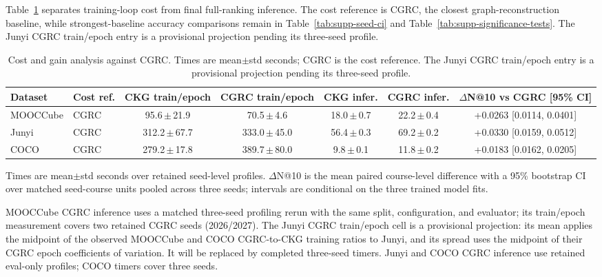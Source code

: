 Table~\ref{tab:supp-cost-tradeoff} separates training-loop cost from final full-ranking inference. The cost reference is CGRC, the closest graph-reconstruction baseline, while strongest-baseline accuracy comparisons remain in Table~\ref{tab:supp-seed-ci} and Table~\ref{tab:supp-significance-tests}. The Junyi CGRC train/epoch entry is a provisional projection pending its three-seed profile.

\begin{table}[t]
\centering
\caption{Cost and gain analysis against CGRC. Times are mean\(\pm\)std seconds; CGRC is the cost reference. The Junyi CGRC train/epoch entry is a provisional projection pending its three-seed profile.}
\label{tab:supp-cost-tradeoff}
\tablecaptiongap
\small
\setlength{\tabcolsep}{2.4pt}
\begin{tabular*}{\textwidth}{@{\extracolsep{\fill}}llccccc}
\toprule
Dataset & Cost ref. & CKG train/epoch & CGRC train/epoch & CKG infer. & CGRC infer. & \(\Delta\)N@10 vs CGRC [95\% CI] \\
\midrule
MOOCCube & CGRC & 95.6\,$\pm$\,21.9 & 70.5\,$\pm$\,4.6 & 18.0\,$\pm$\,0.7 & 22.2\,$\pm$\,0.4 & +0.0263 [0.0114, 0.0401] \\
Junyi & CGRC & 312.2\,$\pm$\,67.7 & 333.0\,$\pm$\,45.0 & 56.4\,$\pm$\,0.3 & 69.2\,$\pm$\,0.2 & +0.0330 [0.0159, 0.0512] \\
COCO & CGRC & 279.2\,$\pm$\,17.8 & 389.7\,$\pm$\,80.0 & 9.8\,$\pm$\,0.1 & 11.8\,$\pm$\,0.2 & +0.0183 [0.0162, 0.0205] \\
\bottomrule
\end{tabular*}
\vspace{2pt}
\parbox{\textwidth}{\footnotesize Times are mean\(\pm\)std seconds over retained seed-level profiles. \(\Delta\)N@10 is the mean paired course-level difference with a 95\% bootstrap CI over matched seed-course units pooled across three seeds; intervals are conditional on the three trained model fits.}
\end{table}

\noindent\footnotesize MOOCCube CGRC inference uses a matched three-seed profiling rerun with the same split, configuration, and evaluator; its train/epoch measurement covers two retained CGRC seeds (2026/2027). The Junyi CGRC train/epoch cell is a provisional projection: its mean applies the midpoint of the observed MOOCCube and COCO CGRC-to-CKG training ratios to Junyi, and its spread uses the midpoint of their CGRC epoch coefficients of variation. It will be replaced by completed three-seed timers. Junyi and COCO CGRC inference use retained eval-only profiles; COCO timers cover three seeds. \normalsize

